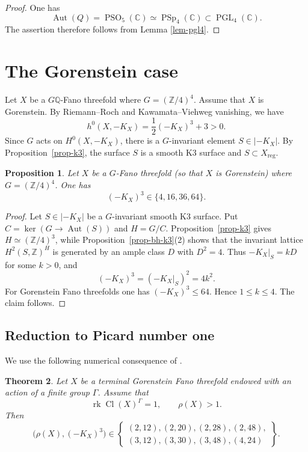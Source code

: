\documentclass[10pt,oneside,reqno]{amsart}
\numberwithin{equation}{section}
\newtheorem{theorem}{Theorem}[section]
\newtheorem{proposition}[theorem]{Proposition}
\theoremstyle{definition}
\newcommand{\Z}{\mathbb Z}
\newcommand{\C}{\mathbb C}
\newcommand{\Cl}{\operatorname{Cl}}
\newcommand{\Aut}{\operatorname{Aut}}
\newcommand{\rk}{\operatorname{rk}}
\begin{document}
\begin{proof}
One has
\[
 \Aut(Q)=\operatorname{PSO}_5(\C)
 \simeq\operatorname{PSp}_4(\C)
 \subset\operatorname{PGL}_4(\C).
\]
The assertion therefore follows from Lemma \ref{lem-pgl4}.
\end{proof}

\section{The Gorenstein case}
\label{sec-gorenstein}
Let $X$ be a $G\mathbb{Q}$-Fano threefold where $G=(\mathbb{Z}/4)^4$. 
Assume that $X$ is Gorenstein.  By Riemann--Roch and
Kawamata--Viehweg vanishing, we have
\[
h^0(X,-K_X)=\frac12(-K_X)^3+3>0.
\]
Since $G$ acts on $H^0(X,-K_X)$, there is a $G$-invariant element
$S\in|-K_X|$.  By Proposition~\ref{prop-k3}, the surface $S$ is a smooth
K3 surface and $S\subset X_{\mathrm{reg}}$.

\begin{proposition}
\label{prop-degree}
Let $X$ be a $G$-Fano threefold (so that $X$ is Gorenstein) where $G=(\mathbb{Z}/4)^4$. 
One has
\[
 (-K_X)^3\in\{4,16,36,64\}.
\]
\end{proposition}

\begin{proof}
Let $S\in |-K_X|$ be a $G$-invariant smooth K3 surface.  
Put $C=\ker(G\to\Aut(S))$ and $H=G/C$.  
Proposition~\ref{prop-k3} gives $H\simeq(\Z/4)^3$, while
Proposition~\ref{prop-bh-k3}(2) shows that the invariant lattice
$H^2(S,\Z)^H$ is generated by an ample class $D$ with $D^2=4$.
Thus $-K_X|_S=kD$ for some $k>0$,
and
\[
 (-K_X)^3=(-K_X|_S)^2=4k^2.
\]
For Gorenstein Fano threefolds one has
$(-K_X)^3\leq64$. Hence
$1\leq k\leq4$. The claim follows.
\end{proof}

\subsection{Reduction to Picard number one}

We use the following numerical consequence of
\cite[Theorems 1.2 and 6.5]{ProkhorovGFanoII}.

\begin{theorem}
\label{thm-prokhorov}
Let $X$ be a terminal Gorenstein Fano threefold endowed with an action
of a finite group $\Gamma$.  Assume that
\[
 \rk\Cl(X)^\Gamma=1,
 \qquad \rho(X)>1.
\]
Then
\[
 \bigl(\rho(X),(-K_X)^3\bigr)\in
 \left\{
 \begin{array}{c}
 (2,12),(2,20),(2,28),(2,48),\\
 (3,12),(3,30),(3,48),(4,24)
 \end{array}
 \right\}.
\]
\end{theorem}
\end{document}
